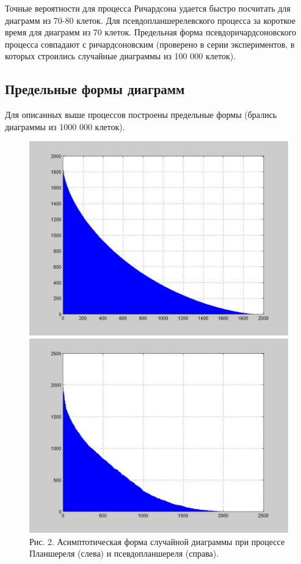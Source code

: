 \documentclass[12pt]{report}
\begin{document}
Точные вероятности для процесса Ричардсона удается быстро посчитать для диаграмм из 70-80 клеток. Для псевдопланшерелевского процесса за короткое время для диаграмм из 70 клеток. Предельная форма псевдоричардсоновского процесса совпадают с ричардсоновским (проверено в серии экспериментов, в которых строились случайные диаграммы из 100 000 клеток).

\subsection*{Предельные формы диаграмм}

\hspace{\parindent} Для описанных выше процессов построены предельные формы (брались диаграммы из 1000 000 клеток). 

\begin{figure}[!ht]
\begin{center}
\includegraphics[scale=0.2]{Plansherel_assympt}
\includegraphics[scale=0.2]{ALPHA_assympt}
\\Рис. 2. Асимптотическая форма случайной диаграммы при процессе Планшереля (слева) и псевдопланшереля (справа).
\end{center}
\end{figure}
\end{document}
